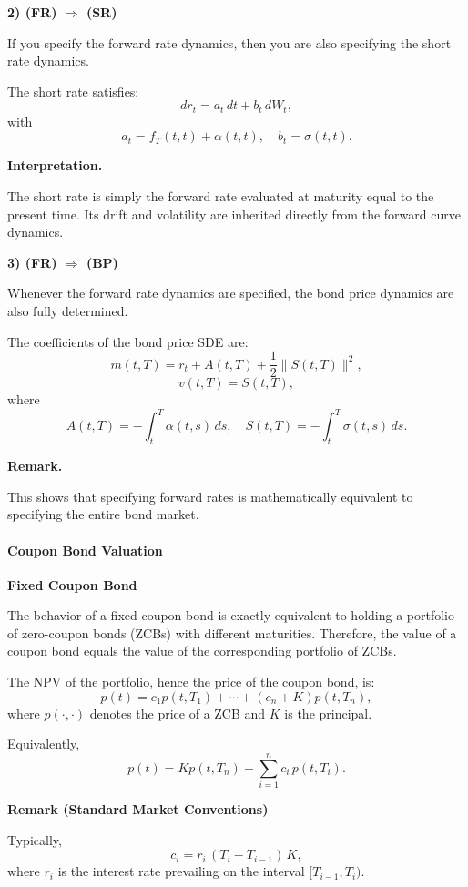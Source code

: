 \documentclass[12pt,a4paper]{article}
\theoremstyle{definition}
\begin{document}
\textbf{2) (FR) $\Rightarrow$ (SR)}

If you specify the forward rate dynamics, then you are also specifying the short rate dynamics.

The short rate satisfies:
\[
dr_t = a_t \, dt + b_t \, dW_t,
\]
with
\[
a_t = f_T(t, t) + \alpha(t, t), \quad b_t = \sigma(t, t).
\]

\textbf{Interpretation.}

The short rate is simply the forward rate evaluated at maturity equal to the present time. Its drift and volatility are inherited directly from the forward curve dynamics.

\textbf{3) (FR) $\Rightarrow$ (BP)}

Whenever the forward rate dynamics are specified, the bond price dynamics are also fully determined.

The coefficients of the bond price SDE are:
\[
m(t, T) = r_t + A(t, T) + \frac{1}{2}\|S(t, T)\|^2,
\]
\[
v(t, T) = S(t, T),
\]
where
\[
A(t, T) = -\int_t^T \alpha(t, s) \, ds, \quad S(t, T) = -\int_t^T \sigma(t, s) \, ds.
\]

\textbf{Remark.}

This shows that specifying forward rates is mathematically equivalent to specifying the entire bond market.

\paragraph{Coupon Bond Valuation}

\textbf{Fixed Coupon Bond}


The behavior of a fixed coupon bond is exactly equivalent to holding a portfolio of zero-coupon bonds (ZCBs) with different maturities. Therefore, the value of a coupon bond equals the value of the corresponding portfolio of ZCBs.

The NPV of the portfolio, hence the price of the coupon bond, is:
\[
p(t) = c_1 p(t, T_1) + \cdots + (c_n + K) p(t, T_n),
\]
where $p(\cdot, \cdot)$ denotes the price of a ZCB and $K$ is the principal.

Equivalently,
\[
p(t) = K p(t, T_n) + \sum_{i=1}^n c_i \, p(t, T_i).
\]

\textbf{Remark (Standard Market Conventions)}

Typically,
\[
c_i = r_i \, (T_i - T_{i-1}) \, K,
\]
where $r_i$ is the interest rate prevailing on the interval $[T_{i-1}, T_i)$.
\end{document}
